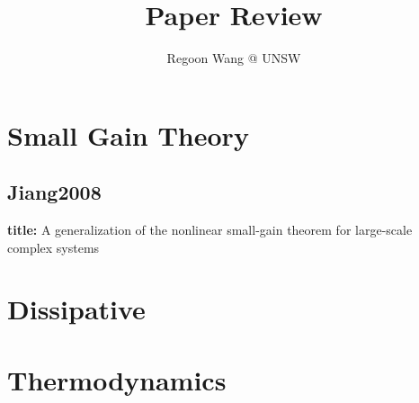 \documentclass[10pt,a4paper]{article}
\begin{document}
\newcommand{\file}[1]{\textbf{title:} #1 \\}
\title{Paper Review}
\author{Regoon Wang @ UNSW}
\maketitle

\tableofcontents
\section{Small Gain Theory}
\subsection{Jiang2008}
\file{A generalization of the nonlinear small-gain theorem for large-scale complex systems\cite{Jiang2008}}
\section{Dissipative}
\section{Thermodynamics}



\end{document}
